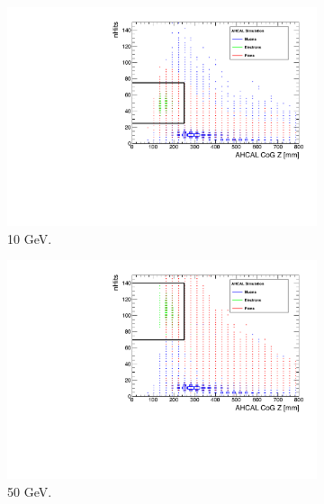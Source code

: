 \begin{figure}[htbp!]
\begin{subfigure}[t]{0.5\textwidth}
		\includegraphics[width=1\linewidth]{chap5/fig_AHCAL_timing/Electrons/SelectionCut_nHitsCoGZ_10GeV}
		\caption{10 GeV.} \label{fig:e10GeV_nHitsCoGZ}
	\end{subfigure}
	\hfill
	\begin{subfigure}[t]{0.5\textwidth}
		\centering
		\includegraphics[width=1\linewidth]{chap5/fig_AHCAL_timing/Electrons/SelectionCut_nHitsCoGZ_50GeV}
		\caption{50 GeV.} \label{fig:e50GeV_nHitsCoGZ}
	\end{subfigure}
	\hfill
	\begin{subfigure}[t]{0.5\textwidth}
		\centering

\end{subfigure}
\end{figure}
